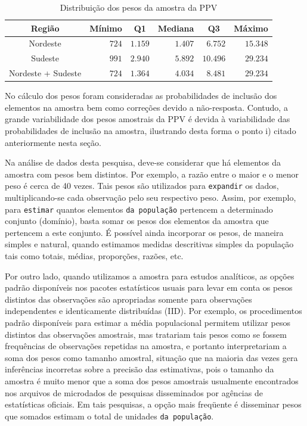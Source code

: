\documentclass[]{book}
\numberwithin{example}{chapter}
\numberwithin{remark}{chapter}
\numberwithin{definition}{chapter}
\begin{document}
\begin{center}
\begin{table}[htbp] \centering

\caption{Distribuição dos pesos da amostra da PPV}\bigskip \label{table:Tab12} 
\begin{tabular}{|c|r|c|r|c|r|}
\hline\hline
Região & Mínimo & Q1 & Mediana & Q3 & Máximo \\ \hline\hline
Nordeste & $724$ & \multicolumn{1}{|r|}{$1.159$} & $1.407$ & 
\multicolumn{1}{|r|}{$6.752$} & $15.348$ \\ 
Sudeste & $991$ & \multicolumn{1}{|r|}{$2.940$} & $5.892$ & 
\multicolumn{1}{|r|}{$10.496$} & $29.234$ \\ 
Nordeste + Sudeste & $724$ & \multicolumn{1}{|r|}{$1.364$} & $4.034$ & 
\multicolumn{1}{|r|}{$8.481$} & $29.234$ \\ \hline\hline
\end{tabular}

\end{table}

\end{center}

No cálculo dos pesos foram consideradas as probabilidades de inclusão
dos elementos na amostra bem como correções devido a não-resposta.
Contudo, a grande variabilidade dos pesos amostrais da PPV é devida à
variabilidade das probabilidades de inclusão na amostra, ilustrando
desta forma o ponto i) citado anteriormente nesta seção.

Na análise de dados desta pesquisa, deve-se considerar que há elementos
da amostra com pesos bem distintos. Por exemplo, a razão entre o maior e
o menor peso é cerca de 40 vezes. Tais pesos são utilizados para
\texttt{expandir} os dados, multiplicando-se cada observação pelo seu
respectivo peso. Assim, por exemplo, para \texttt{estimar} quantos
elementos \texttt{da\ população} pertencem a determinado conjunto
(domínio), basta somar os pesos dos elementos da amostra que pertencem a
este conjunto. É possível ainda incorporar os pesos, de maneira simples
e natural, quando estimamos medidas descritivas simples da população
tais como totais, médias, proporções, razões, etc.

Por outro lado, quando utilizamos a amostra para estudos analíticos, as
opções padrão disponíveis nos pacotes estatísticos usuais para levar em
conta os pesos distintos das observações são apropriadas somente para
observações independentes e identicamente distribuídas (IID). Por
exemplo, os procedimentos padrão disponíveis para estimar a média
populacional permitem utilizar pesos distintos das observações
amostrais, mas tratariam tais pesos como se fossem frequências de
observações repetidas na amostra, e portanto interpretariam a soma dos
pesos como tamanho amostral, situação que na maioria das vezes gera
inferências incorretas sobre a precisão das estimativas, pois o tamanho
da amostra é muito menor que a soma dos pesos amostrais usualmente
encontrados nos arquivos de microdados de pesquisas disseminados por
agências de estatísticas oficiais. Em tais pesquisas, a opção mais
freqüente é disseminar pesos que somados estimam o total de unidades
\texttt{da\ população}.
\end{document}
